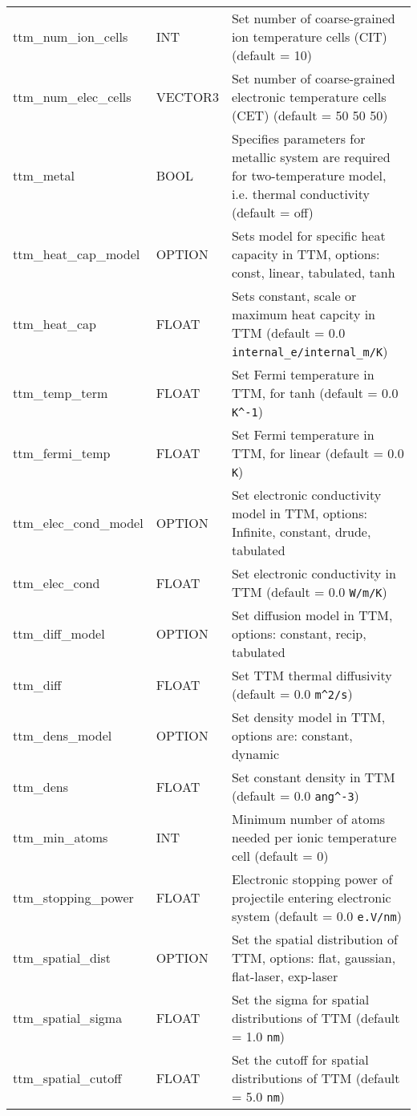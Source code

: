 \begin{longtable}{l l p{10cm}}
ttm\_num\_ion\_cells & INT & Set number of coarse-grained ion temperature cells (CIT) (default = 10) \\
ttm\_num\_elec\_cells & VECTOR3 & Set number of coarse-grained electronic temperature cells (CET) (default = 50 50 50) \\
ttm\_metal & BOOL & Specifies parameters for metallic system are required for two-temperature model, i.e. thermal conductivity (default = off) \\
ttm\_heat\_cap\_model & OPTION & Sets model for specific heat capacity in TTM, options: const, linear, tabulated, tanh\\
ttm\_heat\_cap & FLOAT & Sets constant, scale or maximum heat capcity in TTM (default = 0.0 \verb#internal_e/internal_m/K#) \\
ttm\_temp\_term & FLOAT & Set Fermi temperature in TTM, for tanh (default = 0.0 \verb#K^-1#) \\
ttm\_fermi\_temp & FLOAT & Set Fermi temperature in TTM, for linear (default = 0.0 \verb#K#) \\
ttm\_elec\_cond\_model & OPTION & Set electronic conductivity model in TTM, options: Infinite, constant, drude, tabulated\\
ttm\_elec\_cond & FLOAT & Set electronic conductivity in TTM (default = 0.0 \verb#W/m/K#) \\
ttm\_diff\_model & OPTION & Set diffusion model in TTM, options: constant, recip, tabulated\\
ttm\_diff & FLOAT & Set TTM thermal diffusivity (default = 0.0 \verb#m^2/s#) \\
ttm\_dens\_model & OPTION & Set density model in TTM, options are: constant, dynamic\\
ttm\_dens & FLOAT & Set constant density in TTM (default = 0.0 \verb#ang^-3#) \\
ttm\_min\_atoms & INT & Minimum number of atoms needed per ionic temperature cell (default = 0) \\
ttm\_stopping\_power & FLOAT & Electronic stopping power of projectile entering electronic system (default = 0.0 \verb#e.V/nm#) \\
ttm\_spatial\_dist & OPTION & Set the spatial distribution of TTM, options: flat, gaussian, flat-laser, exp-laser\\
ttm\_spatial\_sigma & FLOAT & Set the sigma for spatial distributions of TTM (default = 1.0 \verb#nm#) \\
ttm\_spatial\_cutoff & FLOAT & Set the cutoff for spatial distributions of TTM (default = 5.0 \verb#nm#) \\

\end{longtable}
